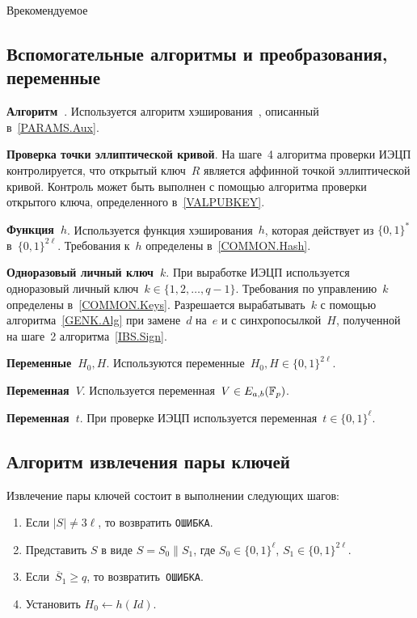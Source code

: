 \begin{appendix}{В}{рекомендуемое}
\subsection{Вспомогательные алгоритмы и преобразования, 
переменные}\label{IBS.Transforms}

{\bf Алгоритм~}.
Используется алгоритм хэширования~, 
описанный в~\ref{PARAMS.Aux}.

{\bf Проверка точки эллиптической кривой}.
На шаге~4 алгоритма проверки ИЭЦП контролируется,
что открытый ключ~$R$ является аффинной точкой эллиптической кривой.
Контроль может быть выполнен с помощью алгоритма
проверки открытого ключа, определенного в~\ref{VALPUBKEY}.

{\bf Функция~$h$}.
Используется функция хэширования~$h$, 
которая действует из $\{0,1\}^{*}$ в~$\{0,1\}^{2\ell}$.
Требования к~$h$ определены в~\ref{COMMON.Hash}.

{\bf Одноразовый личный ключ~$k$}.
При выработке ИЭЦП используется одноразовый личный 
ключ~$k\in\{1,2,\ldots,q-1\}$.
Требования по управлению~$k$ определены в~\ref{COMMON.Keys}.
Разрешается вырабатывать~$k$ с помощью алгоритма~\ref{GENK.Alg}
при замене~$d$ на~$e$ и с синхропосылкой~$H$, 
полученной на шаге~2 алгоритма~\ref{IBS.Sign}.

{\bf Переменные~$H_0, H$}.
Используются переменные~$H_0, H\in\{0,1\}^{2\ell}$.

{\bf Переменная~$V$}.
Используется переменная~$V\in E_{a,b}(\mathbb{F}_p)$.

{\bf Переменная~$t$}.
При проверке ИЭЦП используется переменная~$t\in\{0,1\}^\ell$.

\subsection{Алгоритм извлечения пары ключей}
\label{IBS.Extract}

Извлечение пары ключей состоит в выполнении следующих шагов:
\begin{enumerate}
\item
Если $|S|\neq 3\ell$,
то возвратить \texttt{ОШИБКА}.

\item
Представить $S$ в виде $S=S_0\parallel S_1$,
где $S_0\in\{0,1\}^\ell$, $S_1\in\{0,1\}^{2\ell}$.

\item
Если~$\overline{S}_1\geq q$,
то возвратить~\texttt{ОШИБКА}.

\item
Установить $H_0\leftarrow h(Id)$.


\end{enumerate}
\end{appendix}
